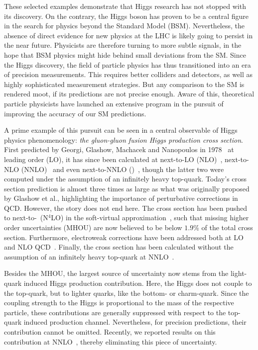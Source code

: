 These selected examples demonstrate that Higgs research has not stopped with its discovery. On the contrary, the Higgs boson has proven to be a central figure in the search for physics beyond the Standard Model (\acs{BSM}). Nevertheless, the absence of direct evidence for new physics at the LHC is likely going to persist in the near future. Physicists are therefore turning to more subtle signals, in the hope that \acs{BSM} physics might hide behind small deviations from the \acs{SM}. Since the Higgs discovery, the field of particle physics has thus transitioned into an era of precision measurements. This requires better colliders and detectors, as well as highly sophisticated measurement strategies. But any comparison to the \acs{SM} is rendered moot, if its predictions are not precise enough. Aware of this, theoretical particle physicists have launched an extensive program in the pursuit of improving the accuracy of our \acs{SM} predictions.

A prime example of this pursuit can be seen in a central observable of Higgs physics phenomenology: \textit{the gluon-gluon fusion Higgs production cross section}. First predicted by Georgi, Glashow, Machacek and Nanopoulos in 1978~\cite{Georgi:1977gs} at leading order (\acs{LO}), it has since been calculated at next-to-\acs{LO} (\acs{NLO})~\cite{Dawson:1990zj,Djouadi:1991tka}, next-to-\acs{NLO} (\acs{NNLO})~\cite{Catani:2001ic, Harlander:2002wh,Anastasiou:2002yz} and even next-to-\acs{NNLO} (\NNNLO)~\cite{Anastasiou:2015vya,Mistlberger:2018etf}, though the latter two were computed under the assumption of an infinitely heavy top-quark. Today's cross section prediction is almost three times as large as what was originally proposed by Glashow et al., highlighting the importance of perturbative corrections in \acs{QCD}. However, the story does not end here. The cross section has been pushed to next-to-\NNNLO\ (N${}^4$LO) in the soft-virtual approximation~\cite{Das:2020adl}, such that missing higher order uncertainties (\acs{MHOU}) are now believed to be below $1.9\%$ of the total cross section. Furthermore, electroweak corrections have been addressed both at \acs{LO}~\cite{Aglietti:2004nj,Degrassi:2004mx} and \acs{NLO} \acs{QCD}~\cite{Actis:2008ts, Actis:2008ug,Anastasiou:2008tj,Anastasiou:2018adr,Bonetti:2018ukf,Becchetti:2020wof}. Finally, the cross section has been calculated without the assumption of an infinitely heavy top-quark at \acs{NNLO}~\cite{Czakon:2021yub}.

Besides the \acs{MHOU}, the largest source of uncertainty now stems from the light-quark induced Higgs production contribution. Here, the Higgs does not couple to the top-quark, but to lighter quarks, like the bottom- or charm-quark. Since the coupling strength to the Higgs is proportional to the mass of the respective particle, these contributions are generally suppressed with respect to the top-quark induced production channel. Nevertheless, for precision predictions, their contribution cannot be omitted. Recently, we reported results on this contribution at \acs{NNLO}~\cite{Czakon:2023kqm, Czakon:2024ywb}, thereby eliminating this piece of uncertainty.

